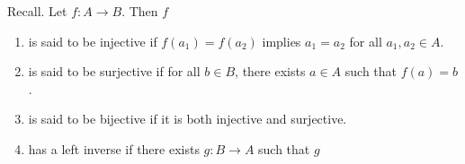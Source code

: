 \documentclass[twocolumn]{article}
\begin{document}
Recall. Let $f : A \rightarrow B$. Then $f$
\begin{enumerate}
	\item
		is said to be injective if $f(a_1) = f(a_2)$ implies $a_1 = a_2$ for all $a_1, a_2 \in A$.
	\item
		is said to be surjective if for all $b \in B$, there exists $a \in A$ such that $f(a) = b$.
	\item
		is said to be bijective if it is both injective and surjective.
	\item
		has a left inverse if there exists $g : B \rightarrow A$ such that $g $
\end{enumerate}
\end{document}
